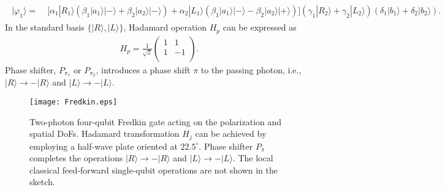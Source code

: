 \documentclass[showpacs,preprintnumbers,showkeys,amsmath,amssymb]{revtex4}%
\begin{document}
%
%
\begin{eqnarray}       \label{eq13}
\begin{split}
|\varphi_1\rangle=\;&
\big[\alpha_{1}|R_1\rangle (\beta_{1}|a_1\rangle|-\rangle + \beta_{2}|a_2\rangle|-\rangle)
%
+\alpha_{2}|L_1\rangle(\beta_{1}|a_1\rangle |-\rangle - \beta_{2}|a_2\rangle|+\rangle)\big]
(\gamma_{1}|R_2\rangle + \gamma_{2}|L_2\rangle) (\delta_{1}|b_1\rangle + \delta_{2}|b_2\rangle).
\end{split}
\end{eqnarray}
In the standard basis $\{|R\rangle,|L\rangle\}$, Hadamard operation $H_p$ can be expressed as
\begin{eqnarray}       \label{eq14}
H_p=\frac{1}{\sqrt{2}}
\left( \begin{array}{cc}
1 & 1 \\
1 & -1 \\
 \end{array}
 \right).
\end{eqnarray}
Phase shifter, $P_{\pi_1}$ or $P_{\pi_2}$, introduces a phase shift  $\pi$ to the passing photon, i.e., $|R\rangle\rightarrow-|R\rangle$ and $|L\rangle\rightarrow-|L\rangle$.



\begin{figure}%
\centering
\texttt{[image: Fredkin.eps]}
\caption{Two-photon four-qubit Fredkin gate acting on the polarization and spatial DoFs. Hadamard transformation $H_j$ can be achieved by employing a half-wave plate oriented at $22.5^\circ$. Phase shifter $P_{\pi}$ completes the operations $|R\rangle\rightarrow-|R\rangle$ and $|L\rangle\rightarrow-|L\rangle$. The local classical feed-forward single-qubit operations are not shown in the sketch.
}
 \label{Fredkin}
\end{figure}
\end{document}
